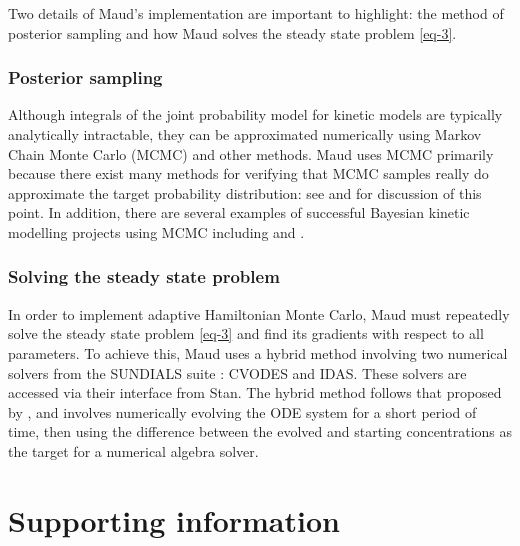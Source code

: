 \documentclass[journal=asbcd6,manuscript=article,layout=traditional]{achemso}
\begin{document}
Two details of Maud's implementation are important to highlight: the
method of posterior sampling and how Maud solves the steady state
problem \eqref{eq-3}.

\hypertarget{posterior-sampling}{%
\subsubsection{Posterior sampling}\label{posterior-sampling}}

Although integrals of the joint probability model for kinetic models are
typically analytically intractable, they can be approximated numerically
using Markov Chain Monte Carlo (MCMC) and other methods. Maud uses MCMC
primarily because there exist many methods for verifying that MCMC
samples really do approximate the target probability distribution: see
\citet{vehtariRankNormalizationFoldingLocalization2021} and
\citet{taltsValidatingBayesianInference2018} for discussion of this
point. In addition, there are several examples of successful Bayesian
kinetic modelling projects using MCMC including
\citet{st.johnBayesianInferenceMetabolic2018} and
\citet{xingModelingKineticsLargescale2010}.

\hypertarget{solving-the-steady-state-problem}{%
\subsubsection{Solving the steady state
problem}\label{solving-the-steady-state-problem}}

In order to implement adaptive Hamiltonian Monte Carlo, Maud must
repeatedly solve the steady state problem \eqref{eq-3} and find its
gradients with respect to all parameters. To achieve this, Maud uses a
hybrid method involving two numerical solvers from the SUNDIALS suite
\citep{serbanCVODESSensitivityEnabledODE2005}: CVODES and IDAS. These
solvers are accessed via their interface from Stan. The hybrid method
follows that proposed by \citet{margossianComputingSteadyStates2018},
and involves numerically evolving the ODE system for a short period of
time, then using the difference between the evolved and starting
concentrations as the target for a numerical algebra solver.

\hypertarget{supporting-information}{%
\section{Supporting information}\label{supporting-information}}
\end{document}
